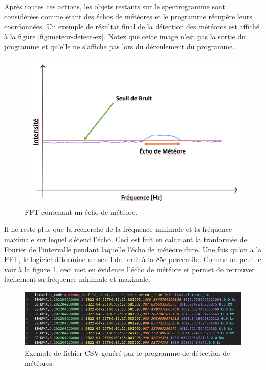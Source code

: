 \documentclass[11pt]{article}
\begin{document}
Après toutes ces actions, les objets restants sur le spectrogramme sont considérées comme étant des échos de météores et le programme récupère leurs coordonnées.
Un exemple de résultat final de la détection des météores est affiché à la figure \ref{fig:meteor-detect-ex}.
Notez que cette image n'est pas la sortie du programme et qu'elle ne s'affiche pas lors du déroulement du programme.

\begin{figure}[h]
    \begin{center}
        \includegraphics[scale=0.4]{Screenshot 2022-08-14 235407.png}
        \caption{FFT contenant un écho de météore.}
        \label{fig:meteor-fft}
    \end{center}
\end{figure}

Il ne reste plus que la recherche de la fréquence minimale et la fréquence maximale sur lequel s'étend l'écho.
Ceci est fait en calculant la tranformée de Fourier de l'intervalle pendant laquelle l'écho de météore dure.
Une fois qu'on a la FFT, le logiciel détermine un seuil de bruit à la 85e percentile.
Comme on peut le voir à la figure \ref{fig:meteor-fft}, ceci met en évidence l'écho de météore et permet de retrouver facilement sa fréquence minimale et maximale.\\

\begin{figure}[h]
    \begin{center}
        \includegraphics[scale=0.44]{Screenshot from 2022-05-31 16-35-06.png}
        \caption{Exemple de fichier CSV généré par le programme de détection de météores.}
        \label{fig:csv-example}
    \end{center}
\end{figure}
\end{document}
